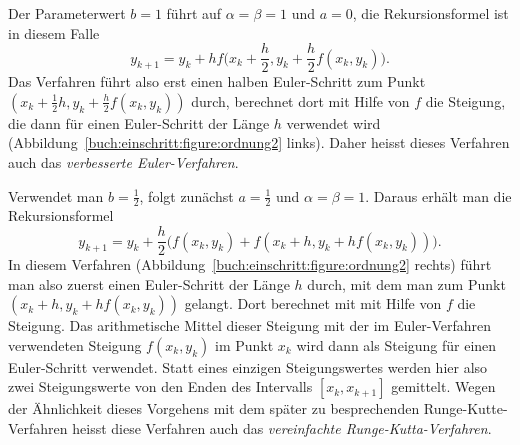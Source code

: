 Der Parameterwert $b=1$ führt auf $\alpha=\beta=1$ und $a=0$, die
Rekursionsformel ist in diesem Falle
\begin{equation}
y_{k+1}=y_{k}+hf\biggl(x_k+\frac{h}2,y_k+\frac{h}2 f(x_k,y_k)\biggr).
\label{buch:ode:improved-euler}
\end{equation}
Das Verfahren führt also erst einen halben Euler-Schritt zum Punkt
$(x_k+\frac12h,y_k+\frac{h}2f(x_k,y_k))$ durch, berechnet dort mit Hilfe
von $f$ die Steigung, die dann für einen Euler-Schritt der Länge $h$
verwendet wird
(Abbildung~\ref{buch:einschritt:figure:ordnung2} links).
Daher heisst dieses Verfahren auch das {\em verbesserte Euler-Verfahren}.
%

Verwendet man $b=\frac12$, folgt zunächst $a=\frac12$ und $\alpha=\beta=1$.
Daraus erhält man die Rekursionsformel
\begin{equation}
y_{k+1}=y_k+\frac{h}2\biggl(
f(x_k,y_k) + f(x_k+h, y_k + hf(x_k,y_k))
\biggr).
\label{buch:ode:simplified-runge-kutta}
\end{equation}
In diesem Verfahren
(Abbildung~\ref{buch:einschritt:figure:ordnung2} rechts)
führt man also zuerst einen Euler-Schritt der Länge
$h$ durch, mit dem man zum Punkt $(x_k+h, y_k+hf(x_k,y_k))$ gelangt.
Dort berechnet mit mit Hilfe von $f$ die Steigung.
Das arithmetische Mittel dieser Steigung mit der im Euler-Verfahren
verwendeten Steigung $f(x_k,y_k)$ im Punkt $x_k$ wird dann als
Steigung für einen Euler-Schritt verwendet.
Statt eines einzigen Steigungswertes werden hier also zwei Steigungswerte
von den Enden des Intervalls $[x_k,x_{k+1}]$ gemittelt.
Wegen der Ähnlichkeit dieses Vorgehens mit dem später zu besprechenden
Runge-Kutte-Verfahren heisst diese Verfahren auch das
{\em vereinfachte Runge-Kutta-Verfahren}.

